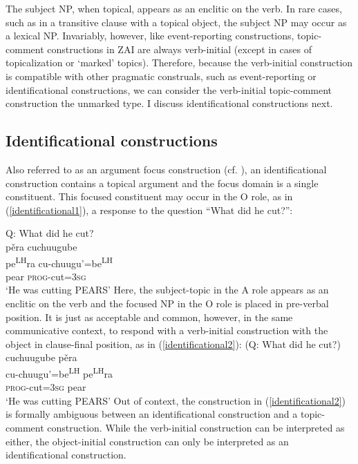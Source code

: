 The subject NP, when topical, appears as an enclitic on the verb. In rare cases, such as in a transitive clause with a topical object, the subject NP may occur as a lexical NP. Invariably, however, like event-reporting constructions, topic-comment constructions in ZAI are always verb-initial (except in cases of topicalization or `marked' topics). Therefore, because the verb-initial construction is compatible with other pragmatic construals, such as event-reporting or identificational constructions, we can consider the verb-initial topic-comment construction the unmarked type. I discuss identificational constructions next.


\subsection{Identificational constructions}\label{identificationalsection}

Also referred to as an argument focus construction (cf. ), an identificational construction contains a topical argument and the focus domain is a single constituent. This focused constituent may occur in the O role, as in (\ref{identificational1}), a response to the question ``What did he cut?'':

\ea\label{identificational1} 
{Q: What did he cut?} \\
\glll p\v{e}ra cuchuugube \\
pe\textsuperscript{LH}ra cu-chuugu'=be\textsuperscript{LH} \\
pear \textsc{prog}-cut=\textsc{3sg} \\
\glt `He was cutting PEARS'
\z
Here, the subject-topic in the A role appears as an enclitic on the verb and the focused NP in the O role is placed in pre-verbal position. It is just as acceptable and common, however, in the same communicative context, to respond with a verb-initial construction with the object in clause-final position, as in (\ref{identificational2}):
\ea\label{identificational2} 
(Q: What did he cut?) \\
\glll cuchuugube p\v{e}ra  \\
cu-chuugu'=be\textsuperscript{LH} pe\textsuperscript{LH}ra \\
\textsc{prog}-cut=\textsc{3sg} pear  \\
\glt `He was cutting PEARS'
\z
Out of context, the construction in (\ref{identificational2}) is formally ambiguous between an identificational construction and a topic-comment construction. While the verb-initial construction can be interpreted as either, the object-initial construction can only be interpreted as an identificational construction.

